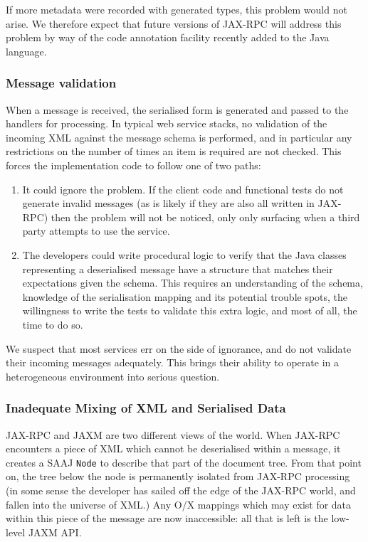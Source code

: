 If more metadata were recorded with generated types, this problem would not
arise. We therefore expect that future versions of JAX-RPC will address this 
problem by way of the code annotation facility recently added to the Java
language. 

\subsubsection{Message validation}
\label{objections:o-x:validation}

When a message is received, the serialised form is generated and
passed to the handlers for processing. In typical web service stacks,
no validation of the incoming XML against the message schema is
performed, and in particular any restrictions on the number of times
an item is required are not checked. This forces the implementation
code to follow one of two paths:
\begin{enumerate}

\item It could ignore the problem. If the client code and functional
tests do not generate invalid messages (as is likely if they are also
all written in JAX-RPC) then the problem will not be noticed, only
only surfacing when a third party attempts to use the service.

\item The developers could write procedural logic to verify that the
Java classes representing a deserialised message have a structure that
matches their expectations given the schema. This requires an
understanding of the schema, knowledge of the serialisation mapping
and its potential trouble spots, the willingness to write the tests to
validate this extra logic, and most of all, the time to do so.

\end{enumerate}

We suspect that most services err on the side of ignorance, and do not
validate their incoming messages adequately. This brings their ability
to operate in a heterogeneous environment into serious question.

\subsubsection{Inadequate Mixing of XML and Serialised Data}
\label{objections:o-x:mixing}

JAX-RPC and JAXM are two different views of the world. When JAX-RPC
encounters a piece of XML which cannot be deserialised within a
message, it creates a SAAJ {\tt Node} to describe that part of the
document tree.  From that point on, the tree below the node is
permanently isolated from JAX-RPC processing (in some sense the
developer has sailed off the edge of the JAX-RPC world, and fallen
into the universe of XML.) Any O/X mappings which may exist for data
within this piece of the message are now inaccessible: all that is
left is the low-level JAXM API.


